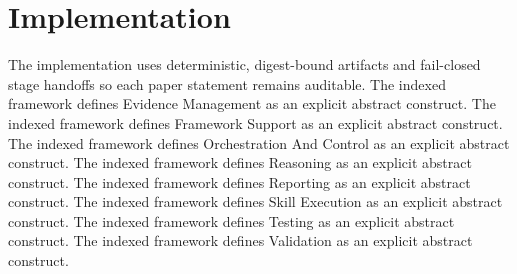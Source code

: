 \section{Implementation}

The implementation uses deterministic, digest-bound artifacts and fail-closed stage handoffs so each paper statement remains auditable. The indexed framework defines Evidence Management as an explicit abstract construct. The indexed framework defines Framework Support as an explicit abstract construct. The indexed framework defines Orchestration And Control as an explicit abstract construct. The indexed framework defines Reasoning as an explicit abstract construct. The indexed framework defines Reporting as an explicit abstract construct. The indexed framework defines Skill Execution as an explicit abstract construct. The indexed framework defines Testing as an explicit abstract construct. The indexed framework defines Validation as an explicit abstract construct.
